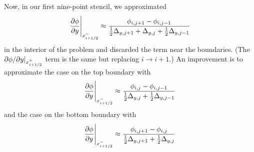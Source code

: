 Now, in our first nine-point stencil, we approximated
\begin{equation*}
  \frac{\partial \phi}{\partial y} \Bigg|_{x_{i+1/2}^-} \approx \frac{\phi_{i,j+1} -
  \phi_{i,j-1}}{\tfrac12 \Delta_{y,j+1} + \Delta_{y,j} + \tfrac12
  \Delta_{y,j-1}}
\end{equation*}
in the interior of the problem and discarded the term near the boundaries. (The 
${\partial \phi}/{\partial y} |_{x_{i+1/2}^+}$ term is the same but replacing $i\to i+1$.)
An improvement is to approximate the case on the top boundary with
\begin{equation*}
  \frac{\partial \phi}{\partial y} \Bigg|_{x_{i+1/2}^-} \approx \frac{\phi_{i,j} -
  \phi_{i,j-1}}{\tfrac12 \Delta_{y,j} + \tfrac12 \Delta_{y,j-1} }
\end{equation*}
and the case on the bottom boundary with 
\begin{equation*}
  \frac{\partial \phi}{\partial y} \Bigg|_{x_{i+1/2}^-} \approx \frac{\phi_{i,j+1} -
  \phi_{i,j}}{\tfrac12 \Delta_{y,j+1} + \tfrac12 \Delta_{y,j} }
\end{equation*}

